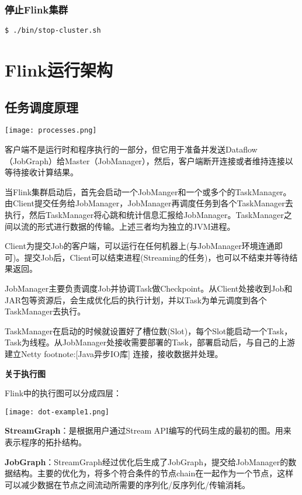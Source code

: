 \documentclass[oneside]{ctexbook}
\begin{document}
\subsection{停止Flink集群}

\begin{lstlisting}
$ ./bin/stop-cluster.sh
\end{lstlisting}

\chapter{Flink运行架构}

\section{任务调度原理}

\noindent \texttt{[image: processes.png]}

客户端不是运行时和程序执行的一部分，但它用于准备并发送Dataflow（JobGraph）给Master（JobManager），然后，客户端断开连接或者维持连接以等待接收计算结果。

当Flink集群启动后，首先会启动一个JobManger和一个或多个的TaskManager。由Client提交任务给JobManager，JobManager再调度任务到各个TaskManager去执行，然后TaskManager将心跳和统计信息汇报给JobManager。TaskManager之间以流的形式进行数据的传输。上述三者均为独立的JVM进程。

Client为提交Job的客户端，可以运行在任何机器上(与JobManager环境连通即可)。提交Job后，Client可以结束进程(Streaming的任务)，也可以不结束并等待结果返回。

JobManager主要负责调度Job并协调Task做Checkpoint。从Client处接收到Job和JAR包等资源后，会生成优化后的执行计划，并以Task为单元调度到各个TaskManager去执行。

TaskManager在启动的时候就设置好了槽位数(Slot)，每个Slot能启动一个Task，Task为线程。从JobManager处接收需要部署的Task，部署启动后，与自己的上游建立Netty footnote:[Java异步IO库] 连接，接收数据并处理。

\textbf{关于执行图}

Flink中的执行图可以分成四层：

\noindent \texttt{[image: dot-example1.png]}

\textbf{StreamGraph}：是根据用户通过Stream API编写的代码生成的最初的图。用来表示程序的拓扑结构。

\textbf{JobGraph}：StreamGraph经过优化后生成了JobGraph，提交给JobManager的数据结构。主要的优化为，将多个符合条件的节点chain在一起作为一个节点，这样可以减少数据在节点之间流动所需要的序列化/反序列化/传输消耗。
\end{document}
